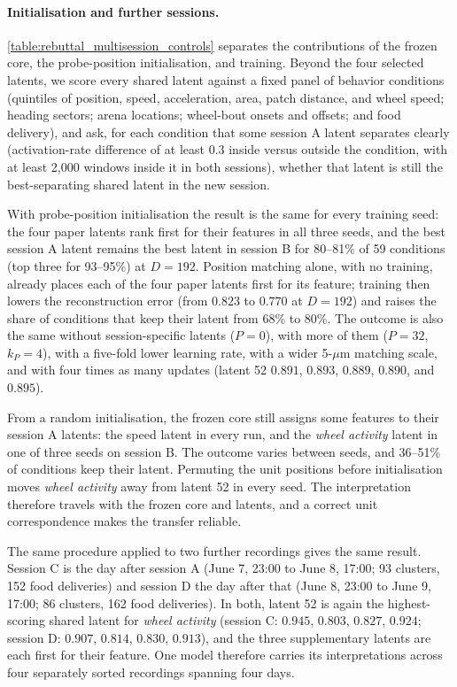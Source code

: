 \paragraph{Initialisation and further sessions.}
\autoref{table:rebuttal_multisession_controls} separates the contributions of the frozen core, the probe-position initialisation, and training. Beyond the four selected latents, we score every shared latent against a fixed panel of behavior conditions (quintiles of position, speed, acceleration, area, patch distance, and wheel speed; heading sectors; arena locations; wheel-bout onsets and offsets; and food delivery), and ask, for each condition that some session A latent separates clearly (activation-rate difference of at least $0.3$ inside versus outside the condition, with at least 2,000 windows inside it in both sessions), whether that latent is still the best-separating shared latent in the new session.

With probe-position initialisation the result is the same for every training seed: the four paper latents rank first for their features in all three seeds, and the best session A latent remains the best latent in session B for 80--81\% of 59 conditions (top three for 93--95\%) at $D=192$. Position matching alone, with no training, already places each of the four paper latents first for its feature; training then lowers the reconstruction error (from $0.823$ to $0.770$ at $D=192$) and raises the share of conditions that keep their latent from 68\% to 80\%. The outcome is also the same without session-specific latents ($P=0$), with more of them ($P=32$, $k_P=4$), with a five-fold lower learning rate, with a wider 5-$\mu$m matching scale, and with four times as many updates (latent 52  $0.891$, $0.893$, $0.889$, $0.890$, and $0.895$).

From a random initialisation, the frozen core still assigns some features to their session A latents: the speed latent in every run, and the \textit{wheel activity} latent in one of three seeds on session B. The outcome varies between seeds, and 36--51\% of conditions keep their latent. Permuting the unit positions before initialisation moves \textit{wheel activity} away from latent 52 in every seed. The interpretation therefore travels with the frozen core and latents, and a correct unit correspondence makes the transfer reliable.

The same procedure applied to two further recordings gives the same result. Session C is the day after session A (June 7, 23:00 to June 8, 17:00; 93 clusters, 152 food deliveries) and session D the day after that (June 8, 23:00 to June 9, 17:00; 86 clusters, 162 food deliveries). In both, latent 52 is again the highest-scoring shared latent for \textit{wheel activity} (session C:  $0.945$,  $0.803$,  $0.827$,  $0.924$; session D: $0.907$, $0.814$, $0.830$, $0.913$), and the three supplementary latents are each first for their feature. One model therefore carries its interpretations across four separately sorted recordings spanning four days.

